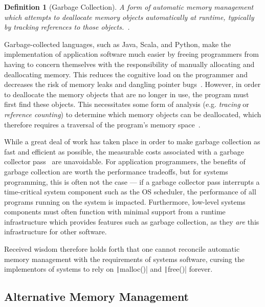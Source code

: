 \documentclass[11pt]{article}
\theoremstyle{break}
\newtheorem{defn}{Definition}
\begin{document}
\begin{defn}[Garbage Collection]
A form of automatic memory management which attempts to deallocate memory objects automatically at runtime, typically by tracking references to those objects.~\cite{Bartley:2003:GC:1074100.1074419,Dijkstra:1978:OGC:359642.359655}.
\end{defn}

Garbage-collected languages, such as Java, Scala, and Python, make the implementation of application software much easier by freeing programmers from having to concern themselves with the responsibility of manually allocating and deallocating memory. This reduces the cognitive load on the programmer and decreases the risk of memory leaks and dangling pointer bugs~\cite{Hertz:2005:QPG:1094811.1094836,Dijkstra:1978:OGC:359642.359655}. However, in order to deallocate the memory objects that are no longer in use, the program must first find these objects. This necessitates some form of analysis (e.g. \textit{tracing} or \textit{reference counting}) to determine which memory objects can be deallocated, which therefore requires a traversal of the program's memory space~\cite{Hertz:2005:QPG:1094811.1094836,Dijkstra:1978:OGC:359642.359655,Bartley:2003:GC:1074100.1074419}.

While a great deal of work has taken place in order to make garbage collection as fast and efficient as possible, the measurable costs associated with a garbage collector pass~\cite{Hertz:2005:QPG:1094811.1094836} are unavoidable. For application programmers, the benefits of garbage collection are worth the performance tradeoffs, but for systems programming, this is often not the case --- if a garbage collector pass interrupts a time-critical system component such as the OS scheduler, the performance of all programs running on the system is impacted. Furthermore, low-level systems components must often function with minimal support from a runtime infrastructure which provides features such as garbage collection, as they \textit{are} this infrastructure for other software.

Received wisdom therefore holds forth that one cannot reconcile automatic memory management with the requirements of systems software, cursing the implementors of systems to rely on \texttt|malloc()| and \texttt|free()| forever.

\subsection{Alternative Memory Management}
\end{document}
